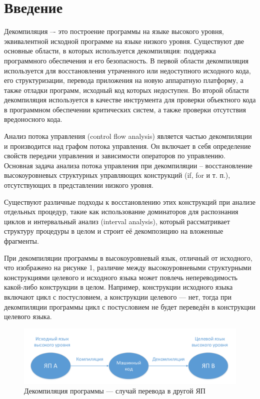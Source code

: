 \documentclass[14pt]{extarticle}
\begin{document}
\tableofcontents
\thispagestyle{empty} 
\pagebreak

\setcounter{page}{4}
\section*{Введение}
Декомпиляция –- это построение программы на языке высокого уровня, эквивалентной исходной программе на языке низкого уровня. Существуют две основные области, в которых используется декомпиляция: поддержка программного обеспечения и его безопасность. В первой области декомпиляция используется для восстановления утраченного или недоступного исходного кода, его структуризации, перевода приложения на новую аппаратную платформу, а также отладки программ, исходный код которых недоступен. Во второй области декомпиляция используется в качестве инструмента для проверки объектного кода в программном обеспечении критических систем, а также проверки отсутствия вредоносного кода.

Анализ потока управления (control flow analysis) является частью декомпиляции и производится над графом потока управления. Он включает в себя определение свойств передачи управления и зависимости операторов по управлению. Основная задача анализа потока управления при декомпиляции – восстановление высокоуровневых структурных управляющих конструкций (if, for и т. п.), отсутствующих в представлении низкого уровня\cite{reengineering}. 

Существуют различные подходы к восстановлению этих конструкций при анализе отдельных процедур, такие как использование доминаторов для распознания циклов и интервальный анализ (interval analysis), который рассматривает структуру процедуры в целом и строит её декомпозицию на вложенные фрагменты\cite{controlflow}.

\pagebreak

При декомпиляции программы в высокоуровневый язык, отличный от исходного, что изображено на рисунке 1, различие между высокоуровневыми структурными конструкциями целевого и исходного языка может повлечь непереводимость какой-либо конструкции в целом. Например, конструкции исходного языка включают цикл с постусловием, а конструкции целевого --- нет, тогда при декомпиляции программы цикл с постусловием не будет переведён в конструкции целевого языка.

\begin{figure}[H]
\includegraphics[width=1\linewidth]{gr1.pdf} 
\caption{Декомпиляция программы --- случай перевода в другой ЯП}
\end{figure}
\end{document}

